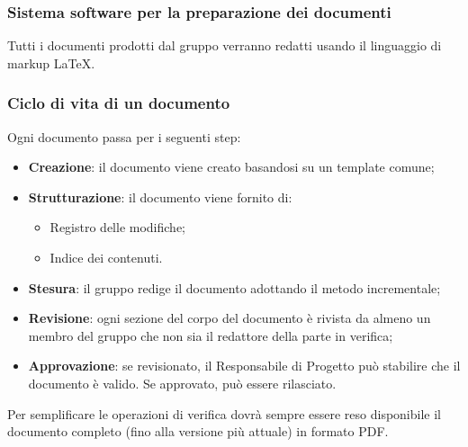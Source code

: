 \subsubsection{Sistema software per la preparazione dei documenti}
Tutti i documenti prodotti dal gruppo verranno redatti usando il linguaggio di markup \LaTeX.

\subsubsection{Ciclo di vita di un documento}
Ogni documento passa per i seguenti step:
\begin{itemize}
  \item \textbf{Creazione}: il documento viene creato basandosi su un template comune;
  \item \textbf{Strutturazione}: il documento viene fornito di:
  \begin{itemize}
  		\item Registro delle modifiche;
  		\item Indice dei contenuti.
	\end{itemize}
  \item \textbf{Stesura}: il gruppo redige il documento adottando il metodo incrementale;
  \item \textbf{Revisione}: ogni sezione del corpo del documento è rivista da almeno un membro del gruppo che non sia il redattore della parte in verifica;
  \item \textbf{Approvazione}: se revisionato, il Responsabile di Progetto può stabilire che il documento è valido. Se approvato, può essere rilasciato.
\end{itemize}
Per semplificare le operazioni di verifica dovrà sempre essere reso disponibile il documento  completo (fino alla versione più attuale) in formato PDF.

